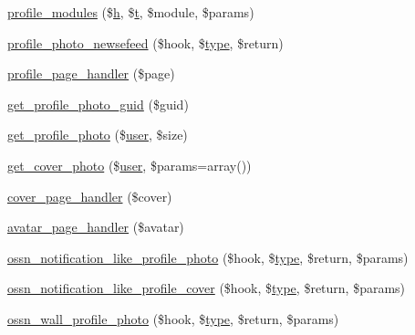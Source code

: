 \begin{DoxyCompactItemize}
\item 
\hyperlink{_ossn_profile_2ossn__com_8php_afd2404e339686e9cdb6e04958a99a487}{profile\+\_\+modules} (\$\hyperlink{jquery-ui_8min_8js_a79fe0eb780a2a4b5543b4dddf8b6188a}{h}, \$\hyperlink{jquery-ui_8min_8js_acf335ef347969ef6dc8387e680fb289e}{t}, \$module, \$params)
\item 
\hyperlink{_ossn_profile_2ossn__com_8php_a431cf907950dd532e4c2e50711faf0f8}{profile\+\_\+photo\+\_\+newsefeed} (\$hook, \$\hyperlink{_ossn_wall_2actions_2wall_2post_2group_8php_a2dc1bb4e1ed0029daa81ac0776b14b51}{type}, \$return)
\item 
\hyperlink{_ossn_profile_2ossn__com_8php_a4311bddaaf3d4ac382c1a97f5c586dea}{profile\+\_\+page\+\_\+handler} (\$page)
\item 
\hyperlink{_ossn_profile_2ossn__com_8php_a71d88ac01bd978ddbbfadcf942abd67b}{get\+\_\+profile\+\_\+photo\+\_\+guid} (\$guid)
\item 
\hyperlink{_ossn_profile_2ossn__com_8php_ad5c87eb473dae0ff318801e5de9f7653}{get\+\_\+profile\+\_\+photo} (\$\hyperlink{ossn_8config_8db_8example_8php_a802544b7ba9f79bbf24ef67773d53bed}{user}, \$size)
\item 
\hyperlink{_ossn_profile_2ossn__com_8php_a13499f7079b4d3f1ce6caae0b649b91f}{get\+\_\+cover\+\_\+photo} (\$\hyperlink{ossn_8config_8db_8example_8php_a802544b7ba9f79bbf24ef67773d53bed}{user}, \$params=array())
\item 
\hyperlink{_ossn_profile_2ossn__com_8php_a642a106e155bafd83d5e4c9a91f153f5}{cover\+\_\+page\+\_\+handler} (\$cover)
\item 
\hyperlink{_ossn_profile_2ossn__com_8php_a1017e4fb85d1f20aa596b790c2c3849a}{avatar\+\_\+page\+\_\+handler} (\$avatar)
\item 
\hyperlink{_ossn_profile_2ossn__com_8php_a2d2d7a2cd573c41f5809bf926b33705c}{ossn\+\_\+notification\+\_\+like\+\_\+profile\+\_\+photo} (\$hook, \$\hyperlink{_ossn_wall_2actions_2wall_2post_2group_8php_a2dc1bb4e1ed0029daa81ac0776b14b51}{type}, \$return, \$params)
\item 
\hyperlink{_ossn_profile_2ossn__com_8php_a48b16e5f424f2e5ba191c1ec8870cb75}{ossn\+\_\+notification\+\_\+like\+\_\+profile\+\_\+cover} (\$hook, \$\hyperlink{_ossn_wall_2actions_2wall_2post_2group_8php_a2dc1bb4e1ed0029daa81ac0776b14b51}{type}, \$return, \$params)
\item 
\hyperlink{_ossn_profile_2ossn__com_8php_aa3a4ad5543a6298814f6c10345150261}{ossn\+\_\+wall\+\_\+profile\+\_\+photo} (\$hook, \$\hyperlink{_ossn_wall_2actions_2wall_2post_2group_8php_a2dc1bb4e1ed0029daa81ac0776b14b51}{type}, \$return, \$params)

\end{DoxyCompactItemize}
